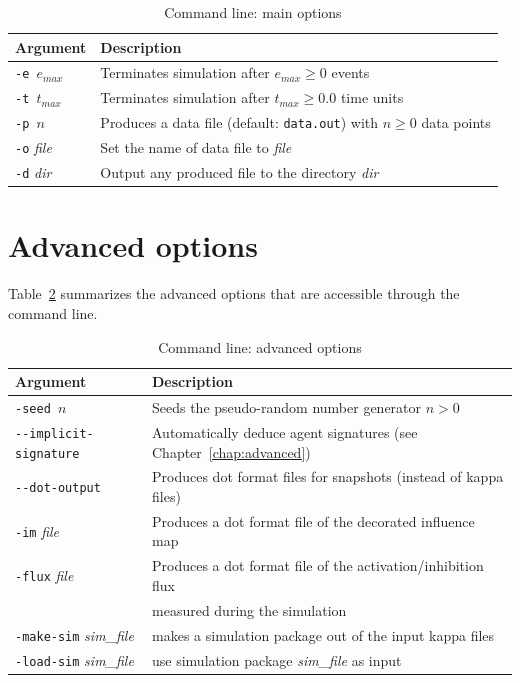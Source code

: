 \documentclass[11pt]{book}
\def\ttt#1{\texttt{#1}}
\def\mit#1{{\mathit #1}}
\def\dd{-\hspace{0.001cm}-}
\begin{document}
\begin{table}[htdp]
\caption{Command line: main options}
\begin{center}
\begin{tabular}{|l|l|}
\hline 
Argument & Description \\ \hline
\ttt{-e $e_\mit{max}$} & Terminates simulation after $e_\mit{max}\geq 0$ events\\
\ttt{-t $t_\mit{max}$} & Terminates simulation after $t_\mit{max}\geq 0.0$ time units\\
\ttt{-p $n$} & Produces a data file\index{data file} (default: \ttt{data.out}) with $n\geq 0$ data points\\
\ttt{-o} \textit{file} & Set the name of data file to \textit{file}\\ 
\ttt{-d} \textit{dir} & Output any produced file to the directory \textit{dir}\\
\hline
\end{tabular}
\end{center}
\label{tab:options}
\end{table}%

\section{Advanced options}

Table~\ref{tab:add-options} summarizes the advanced options that are accessible through the command line.

\begin{table}[htdp]
\caption{Command line: advanced options}
\begin{center}
\begin{tabular}{|l|l|}
\hline 
Argument & Description \\ \hline
\ttt{\small -seed $n$} &\small Seeds the pseudo-random number generator $n>0$ \\
\ttt{\small \dd implicit-signature} &\small Automatically deduce agent signatures (see Chapter~\ref{chap:advanced})\\
\ttt{\small \dd dot-output} &\small Produces dot format files for snapshots (instead of kappa files)\\
\ttt{\small -im} \textit{file} &\small Produces a dot format file of the decorated influence map \\
\ttt{\small -flux} \textit{file} &\small Produces a dot format file of the activation/inhibition flux \\ & measured during the simulation \\
\ttt{\small -make-sim} \textit{sim\_file} &\small makes a simulation package out of the input kappa files \\
\ttt{\small -load-sim} \textit{sim\_file} &\small use simulation package \textit{sim\_file} as input\\


\hline
\end{tabular}
\end{center}
\label{tab:add-options}
\end{table}%
%
\end{document}
